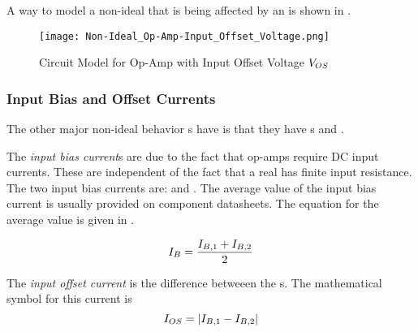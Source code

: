 A way to model a non-ideal  that is being affected by an  is shown in .

\begin{figure}[h!tbp]
  \centering
  \texttt{[image: Non-Ideal\_Op-Amp-Input\_Offset\_Voltage.png]}
  \caption{Circuit Model for Op-Amp with Input Offset Voltage $V_{OS}$ \parencite[p.~97]{sedraTextbook7}}
  \label{fig:Op-Amp_Input_Offset_Voltage}
\end{figure}

\subsubsection{Input Bias and Offset Currents}\label{subsubsec:Input_Bias_Offset_Currents}
The other major non-ideal behavior s have is that they have s and .

\begin{definition}\label{def:Input_Bias_Current}
  The \emph{input bias current}s are due to the fact that op-amps require DC input currents.
  These are independent of the fact that a real  has finite input resistance.
  The two input bias currents are:  and .
  The average value of the input bias current is usually provided on component datasheets.
  The equation for the average value is given in .

  \begin{equation}\label{eq:Average_Input_Bias_Current}
    I_{B} = \frac{I_{B,1} + I_{B,2}}{2}
  \end{equation}
\end{definition}

\begin{definition}\label{def:Input_Offset_Current}
  The \emph{input offset current} is the difference betweeen the s.
  The mathematical symbol for this current is 
  \begin{equation}\label{eq:Input_Offset_Current}
    I_{OS} = \lvert I_{B,1} - I_{B,2} \rvert
  \end{equation}
\end{definition}


